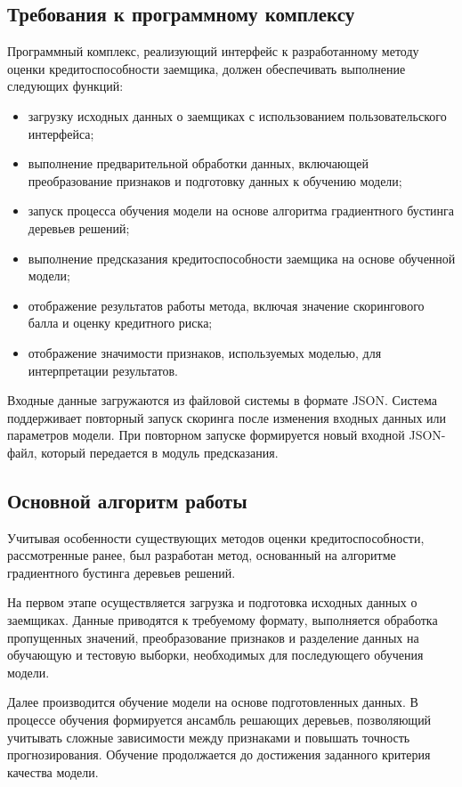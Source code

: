 \subsection{Требования к программному комплексу}

Программный комплекс, реализующий интерфейс к разработанному методу оценки кредитоспособности заемщика, должен обеспечивать выполнение следующих функций:

\begin{itemize}
  \item загрузку исходных данных о заемщиках с использованием пользовательского интерфейса;
  \item выполнение предварительной обработки данных, включающей преобразование признаков и подготовку данных к обучению модели;
  \item запуск процесса обучения модели на основе алгоритма градиентного бустинга деревьев решений;
  \item выполнение предсказания кредитоспособности заемщика на основе обученной модели;
  \item отображение результатов работы метода, включая значение скорингового балла и оценку кредитного риска;
  \item отображение значимости признаков, используемых моделью, для интерпретации результатов.
\end{itemize}

Входные данные загружаются из файловой системы в формате JSON. Система поддерживает повторный запуск скоринга после изменения входных данных или параметров модели. При повторном запуске формируется новый входной JSON-файл, который передается в модуль предсказания.

\subsection{Основной алгоритм работы}

Учитывая особенности существующих методов оценки кредитоспособности, рассмотренные ранее, был разработан метод, основанный на алгоритме градиентного бустинга деревьев решений.

На первом этапе осуществляется загрузка и подготовка исходных данных о заемщиках. Данные приводятся к требуемому формату, выполняется обработка пропущенных значений, преобразование признаков и разделение данных на обучающую и тестовую выборки, необходимых для последующего обучения модели.

Далее производится обучение модели на основе подготовленных данных. В процессе обучения формируется ансамбль решающих деревьев, позволяющий учитывать сложные зависимости между признаками и повышать точность прогнозирования. Обучение продолжается до достижения заданного критерия качества модели.

